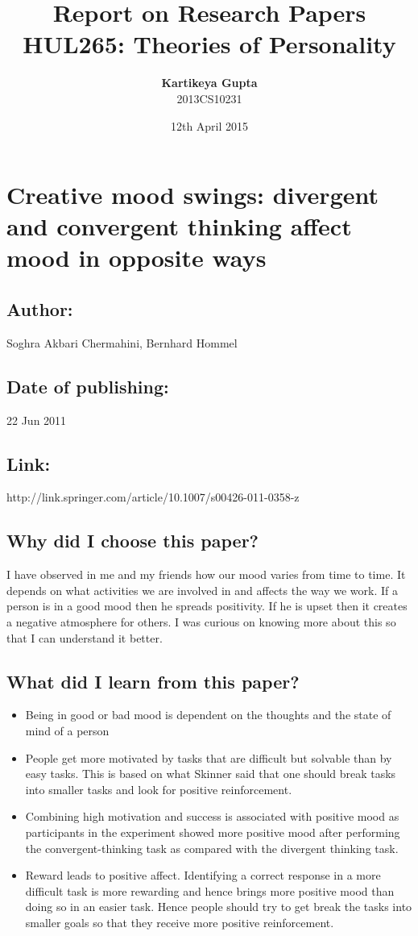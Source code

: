 \documentclass{article}
\title{\textbf{Report on Research Papers}
	  \\ {\large \textbf{HUL265: Theories of Personality}}}
\author
{
	\textbf{Kartikeya Gupta}\\ 
	2013CS10231\\
}
\date{12th April 2015}
\begin{document}
	\maketitle

	\section{Creative mood swings: divergent and convergent thinking affect mood in opposite ways}
		\subsection{Author:} Soghra Akbari Chermahini, Bernhard Hommel
		\subsection{Date of publishing:} 22 Jun 2011
		\subsection{Link:} http://link.springer.com/article/10.1007/s00426-011-0358-z
		\subsection{Why did I choose this paper?}
			I have observed in me and my friends how our mood varies from time to time. It depends on what activities we are involved in and affects the way we work. If a person is in a good mood then he spreads positivity. If he is upset then it creates a negative atmosphere for others. I was curious on knowing more about this so that I can understand it better.
		\subsection{What did I learn from this paper?}
			\begin{itemize}
				\item Being in good or bad mood is dependent on the thoughts and the state of mind of a person
				\item People get more motivated by tasks that are difficult but solvable than by easy tasks. This is based on what Skinner said that one should break tasks into smaller tasks and look for positive reinforcement.
				\item Combining high motivation and success is associated with positive mood as participants in the experiment showed more positive mood after performing the convergent-thinking task as compared with the divergent thinking task.
				\item Reward leads to positive affect. Identifying a correct response in a more difficult task is more rewarding and hence brings more positive mood than doing so in an easier task. Hence people should try to get break the tasks into smaller goals so that they receive more positive reinforcement.
			\end{itemize}
\end{document}
